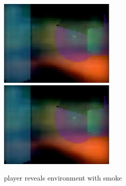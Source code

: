 \begin{figure}
  \centering
  \includegraphics[width=0.5\textwidth]{images/game_systems/ThrowSmoke.png}
  \includegraphics[width=0.5\textwidth]{images/game_systems/ThrowSmoke.png}
  \caption{player reveals environment with smoke}
  \label{SmokeInEnvironment}
\end{figure}

